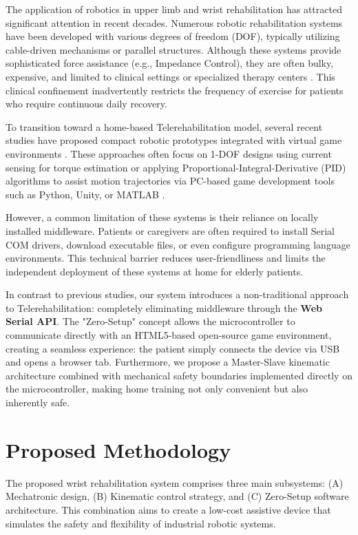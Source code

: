 \documentclass[conference]{IEEEtran}
\begin{document}
The application of robotics in upper limb and wrist rehabilitation has attracted significant attention in recent decades. Numerous robotic rehabilitation systems have been developed with various degrees of freedom (DOF), typically utilizing cable-driven mechanisms or parallel structures. Although these systems provide sophisticated force assistance (e.g., Impedance Control), they are often bulky, expensive, and limited to clinical settings or specialized therapy centers \cite{park2025effects}. This clinical confinement inadvertently restricts the frequency of exercise for patients who require continuous daily recovery.

To transition toward a home-based Telerehabilitation model, several recent studies have proposed compact robotic prototypes integrated with virtual game environments \cite{tolks2024role}. These approaches often focus on 1-DOF designs using current sensing for torque estimation or applying Proportional-Integral-Derivative (PID) algorithms to assist motion trajectories via PC-based game development tools such as Python, Unity, or MATLAB \cite{vo2024design, nikafrooz2017design}.

However, a common limitation of these systems is their reliance on locally installed middleware. Patients or caregivers are often required to install Serial COM drivers, download executable files, or even configure programming language environments. This technical barrier reduces user-friendliness and limits the independent deployment of these systems at home for elderly patients.

In contrast to previous studies, our system introduces a non-traditional approach to Telerehabilitation: completely eliminating middleware through the \textbf{Web Serial API}. The "Zero-Setup" concept allows the microcontroller to communicate directly with an HTML5-based open-source game environment, creating a seamless experience: the patient simply connects the device via USB and opens a browser tab. Furthermore, we propose a Master-Slave kinematic architecture combined with mechanical safety boundaries implemented directly on the microcontroller, making home training not only convenient but also inherently safe.

\section{Proposed Methodology}

The proposed wrist rehabilitation system comprises three main subsystems: (A) Mechatronic design, (B) Kinematic control strategy, and (C) Zero-Setup software architecture. This combination aims to create a low-cost assistive device that simulates the safety and flexibility of industrial robotic systems.
\end{document}
